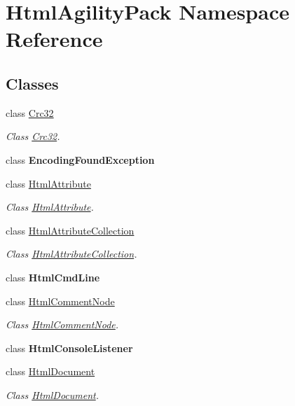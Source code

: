 \hypertarget{namespace_html_agility_pack}{}\section{Html\+Agility\+Pack Namespace Reference}
\label{namespace_html_agility_pack}
\subsection*{Classes}
\begin{DoxyCompactItemize}
\item 
class \hyperlink{class_html_agility_pack_1_1_crc32}{Crc32}
\begin{DoxyCompactList}\small\item\em Class \hyperlink{class_html_agility_pack_1_1_crc32}{Crc32}. \end{DoxyCompactList}\item 
class {\bfseries Encoding\+Found\+Exception}
\item 
class \hyperlink{class_html_agility_pack_1_1_html_attribute}{Html\+Attribute}
\begin{DoxyCompactList}\small\item\em Class \hyperlink{class_html_agility_pack_1_1_html_attribute}{Html\+Attribute}. \end{DoxyCompactList}\item 
class \hyperlink{class_html_agility_pack_1_1_html_attribute_collection}{Html\+Attribute\+Collection}
\begin{DoxyCompactList}\small\item\em Class \hyperlink{class_html_agility_pack_1_1_html_attribute_collection}{Html\+Attribute\+Collection}. \end{DoxyCompactList}\item 
class {\bfseries Html\+Cmd\+Line}
\item 
class \hyperlink{class_html_agility_pack_1_1_html_comment_node}{Html\+Comment\+Node}
\begin{DoxyCompactList}\small\item\em Class \hyperlink{class_html_agility_pack_1_1_html_comment_node}{Html\+Comment\+Node}. \end{DoxyCompactList}\item 
class {\bfseries Html\+Console\+Listener}
\item 
class \hyperlink{class_html_agility_pack_1_1_html_document}{Html\+Document}
\begin{DoxyCompactList}\small\item\em Class \hyperlink{class_html_agility_pack_1_1_html_document}{Html\+Document}. \end{DoxyCompactList}\item 

\end{DoxyCompactItemize}
